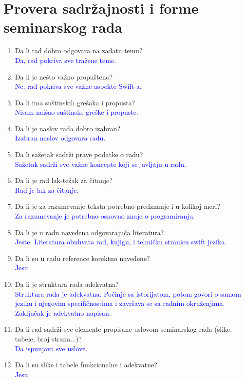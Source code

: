 \documentclass[a4paper]{report}
\newcommand{\odgovor}[1]{\textcolor{blue}{#1}}
\begin{document}
\section{Provera sadržajnosti i forme seminarskog rada}

\begin{enumerate}
\item Da li rad dobro odgovara na zadatu temu?\\
\odgovor{ Da, rad pokriva sve tražene teme.}
\item Da li je nešto važno propušteno?\\ 
\odgovor {Ne, rad pokriva sve važne aspekte Swift-a.}
\item Da li ima suštinskih grešaka i propusta?\\
\odgovor {Nisam naišao suštinske greške i propuste.}
\item Da li je naslov rada dobro izabran?\\
\odgovor {Izabran naslov odgovara radu.}
\item Da li sažetak sadrži prave podatke o radu?\\ 
\odgovor {Sažetak sadrži sve važne koncepte koji se javljaju u radu.}
\item Da li je rad lak-težak za čitanje?\\
\odgovor {Rad je lak za čitanje.}
\item Da li je za razumevanje teksta potrebno predznanje i u kolikoj meri?\\ 
\odgovor {Za razumevanje je potrebno osnovno znaje o programiranju.}
\item Da li je u radu navedena odgovarajuća literatura?\\ 
\odgovor {Jeste. Literatura obuhvata rad, knjigu, i tehničku stranicu swift jezika.}
\item Da li su u radu reference korektno navedene?\\
\odgovor {Jesu.}
\item Da li je struktura rada adekvatna?\\ 
\odgovor {Struktura rada je adekvatna. Počinje sa istorijatom, potom govori o samom jeziku i njegovim specifičnostima i završava se sa radnim okruženjima. Zaključak je adekvatno napisan.}
\item Da li rad sadrži sve elemente propisane uslovom seminarskog rada (slike, tabele, broj strana...)?\\ 
\odgovor {Da ispunjava sve uslove.}
\item Da li su slike i tabele funkcionalne i adekvatne?\\
\odgovor {Jesu.}
\end{enumerate}
\end{document}
